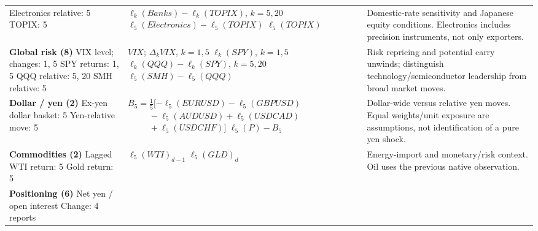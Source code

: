 \documentclass[11pt,a4paper]{article}
\begin{document}
\begin{tabular}{@{}>{\raggedright\arraybackslash}p{.225\linewidth}>{\raggedright\arraybackslash}p{.445\linewidth}>{\raggedright\arraybackslash}p{.285\linewidth}@{}}
Electronics relative: 5\newline
TOPIX: 5
& \mbox{}\newline $\ell_k(Banks)-\ell_k(TOPIX)$, $k=5,20$\newline
$\ell_5(Electronics)-\ell_5(TOPIX)$\newline
$\ell_5(TOPIX)$
& Domestic-rate sensitivity and Japanese equity conditions. Electronics includes precision instruments, not only exporters.\\[4pt]
\textbf{Global risk (8)}\newline
VIX level; changes: 1, 5\newline
SPY returns: 1, 5\newline
QQQ relative: 5, 20\newline
SMH relative: 5
& \mbox{}\newline $VIX$; $\Delta_k VIX$, $k=1,5$\newline
$\ell_k(SPY)$, $k=1,5$\newline
$\ell_k(QQQ)-\ell_k(SPY)$, $k=5,20$\newline
$\ell_5(SMH)-\ell_5(QQQ)$
& Risk repricing and potential carry unwinds; distinguish technology/semiconductor leadership from broad market moves.\\[4pt]
\textbf{Dollar / yen (2)}\newline
Ex-yen dollar basket: 5\newline
Yen-relative move: 5
& \mbox{}\newline $B_5=\tfrac15[-\ell_5(EURUSD)-\ell_5(GBPUSD)$\newline
$\phantom{B_5=} -\ell_5(AUDUSD)+\ell_5(USDCAD)$\newline
$\phantom{B_5=} +\ell_5(USDCHF)]$\newline
$\ell_5(P)-B_5$
& Dollar-wide versus relative yen moves. Equal weights/unit exposure are assumptions, not identification of a pure yen shock.\\[4pt]
\textbf{Commodities (2)}\newline
Lagged WTI return: 5\newline
Gold return: 5
& \mbox{}\newline $\ell_5(WTI)_{d-1}$\newline
$\ell_5(GLD)_d$
& Energy-import and monetary/risk context. Oil uses the previous native observation.\\[4pt]
\textbf{Positioning (6)}\newline
Net yen / open interest\newline
Change: 4 reports\newline

\end{tabular}
\end{document}
